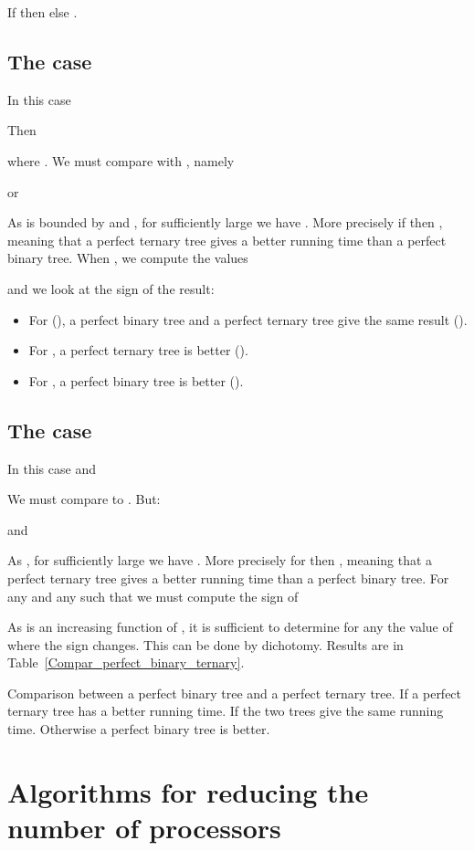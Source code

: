 \documentclass{llncs}
\begin{document}
If  then  else .

\subsection{The case }
In this case 

Then 

where .
We must compare 
 with , namely

or

As  is bounded by  and , for  sufficiently large
we have .
More precisely if  then , meaning that a perfect ternary tree gives a better running time than a perfect binary tree.
When , we compute the  values 

and we look at the sign of the result: 
\begin{itemize}
\item For  (), a perfect binary tree and a perfect ternary tree give the same result ().
\item For ,  a perfect ternary tree is better ().
\item For , a perfect binary tree is better ().
\end{itemize}

\subsection{The case }
In this case  and 

We must compare  to .
But:

and 

As , for  sufficiently large
we have .
More precisely for  then , meaning that a perfect ternary tree gives a better running time than a 
perfect binary tree. For any  and any 
such that  we must compute the sign of

As  is an increasing function of , it is sufficient to determine for any 
the value of  where the sign changes. This can be done by dichotomy. Results are in Table~\ref{Compar_perfect_binary_ternary}.

\begin{table}

\caption{Comparison between a perfect binary tree and a perfect ternary tree. If  a perfect ternary tree has a better running time. 
If  the two trees give the same running time. Otherwise a perfect binary tree is better.}
\label{Compar_perfect_binary_ternary}
\end{table}

\section{Algorithms for reducing the number of processors}\label{red_number_processors}
\end{document}
